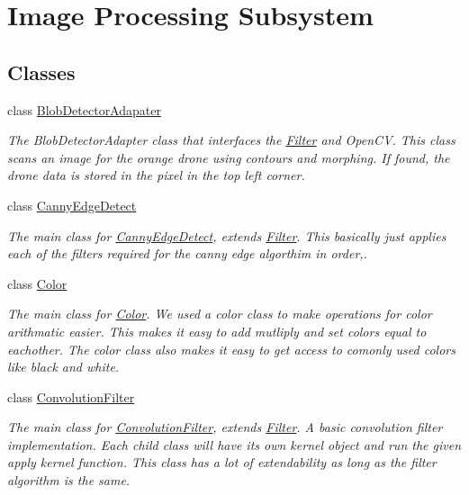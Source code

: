 \hypertarget{group__image}{}\section{Image Processing Subsystem}
\label{group__image}
\subsection*{Classes}
\begin{DoxyCompactItemize}
\item 
class \hyperlink{classBlobDetectorAdapater}{Blob\+Detector\+Adapater}
\begin{DoxyCompactList}\small\item\em The Blob\+Detector\+Adapter class that interfaces the \hyperlink{classFilter}{Filter} and Open\+CV. This class scans an image for the orange drone using contours and morphing. If found, the drone data is stored in the pixel in the top left corner. \end{DoxyCompactList}\item 
class \hyperlink{classCannyEdgeDetect}{Canny\+Edge\+Detect}
\begin{DoxyCompactList}\small\item\em The main class for \hyperlink{classCannyEdgeDetect}{Canny\+Edge\+Detect}, extends \hyperlink{classFilter}{Filter}. This basically just applies each of the filters required for the canny edge algorthim in order,. \end{DoxyCompactList}\item 
class \hyperlink{classColor}{Color}
\begin{DoxyCompactList}\small\item\em The main class for \hyperlink{classColor}{Color}. We used a color class to make operations for color arithmatic easier. This makes it easy to add mutliply and set colors equal to eachother. The color class also makes it easy to get access to comonly used colors like black and white. \end{DoxyCompactList}\item 
class \hyperlink{classConvolutionFilter}{Convolution\+Filter}
\begin{DoxyCompactList}\small\item\em The main class for \hyperlink{classConvolutionFilter}{Convolution\+Filter}, extends \hyperlink{classFilter}{Filter}. A basic convolution filter implementation. Each child class will have it\textquotesingle{}s own kernel object and run the given apply kernel function. This class has a lot of extendability as long as the filter algorithm is the same. \end{DoxyCompactList}\item 

\end{DoxyCompactItemize}
